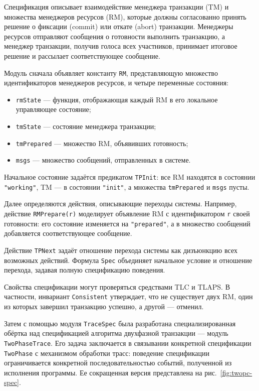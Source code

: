 Спецификация описывает взаимодействие менеджера транзакции (TM) и множества
менеджеров ресурсов (RM), которые должны согласованно принять решение о
фиксации (commit) или откате (abort) транзакции. Менеджеры ресурсов отправляют
сообщения о готовности выполнить транзакцию, а менеджер транзакции, получив
голоса всех участников, принимает итоговое решение и рассылает соответствующее
сообщение.

Модуль сначала объявляет константу \texttt{RM}, представляющую множество
идентификаторов менеджеров ресурсов, и четыре переменные состояния:

\begin{itemize}
    \item \texttt{rmState} --- функция, отображающая каждый RM в его
    локальное управляющее состояние;
    \item \texttt{tmState} --- состояние менеджера транзакции;
    \item \texttt{tmPrepared} --- множество RM, объявивших готовность;
    \item \texttt{msgs} --- множество сообщений, отправленных в системе.
\end{itemize}

Начальное состояние задаётся предикатом \texttt{TPInit}: все RM находятся
в состоянии \texttt{"working"}, TM --- в состоянии \texttt{"init"},
а множества \texttt{tmPrepared} и \texttt{msgs} пусты.

Далее определяются действия, описывающие переходы системы.
Например, действие \texttt{RMPrepare(r)} моделирует объявление RM
с идентификатором \texttt{r} своей готовности: его состояние
изменяется на \texttt{"prepared"}, а в множество сообщений добавляется
соответствующее сообщение.

Действие \texttt{TPNext} задаёт отношение перехода системы как дизъюнкцию
всех возможных действий. Формула \texttt{Spec} объединяет начальное
условие и отношение перехода, задавая полную спецификацию поведения.

Свойства спецификации могут проверяться средствами TLC и TLAPS.
В частности, инвариант \texttt{Consistent} утверждает, что не существует
двух RM, один из которых завершил транзакцию успешно, а другой --- отменил.

Затем с помощью модуля \texttt{TraceSpec} была разработана специализированная
обёртка над спецификацией алгоритма двухфазной транзакции — модуль
\texttt{TwoPhaseTrace}. Его задача заключается в связывании конкретной
спецификации \texttt{TwoPhase} с механизмом обработки трасс: поведение
спецификации ограничивается конкретной последовательностью событий, полученной
из исполнения программы. Ее сокращенная версия представлена на
рис.~\ref{fig:twopc-spec}.

